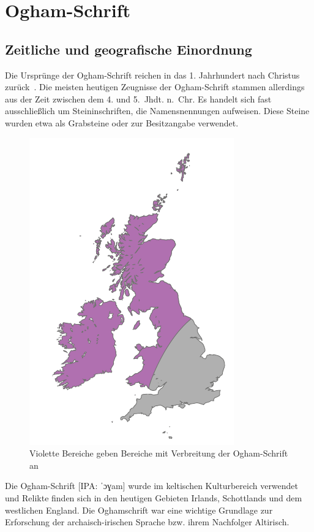 \documentclass[a4paper]{scrartcl}
\begin{document}
\section{Ogham-Schrift}
\subsection{Zeitliche und geografische Einordnung}
%
Die Ursprünge der Ogham-Schrift reichen in das 1. Jahrhundert nach Christus zurück~\cite{ogham-heidnisch1}.
Die meisten heutigen Zeugnisse der Ogham-Schrift stammen allerdings aus der Zeit zwischen dem 4. und 5.~Jhdt. n.~Chr.
Es handelt sich fast ausschließlich um Steininschriften, die Namensnennungen aufweisen. Diese Steine wurden etwa als Grabsteine oder zur Besitzangabe verwendet.
%
\begin{figure}
  \begin{center}
    \includegraphics{images/ogham_areas.pdf}
    \captionsetup{justification=raggedright}
    \caption{Violette Bereiche geben Bereiche mit Verbreitung der Ogham-Schrift an}
  \end{center}
\end{figure}

Die Ogham-Schrift [{\footnotesize IPA:} {\ipafont ˈɔɣam}] wurde im keltischen Kulturbereich verwendet und Relikte finden sich in den heutigen Gebieten Irlands, Schottlands und dem westlichen England. Die Oghamschrift war eine wichtige Grundlage zur Erforschung der archaisch-irischen Sprache bzw. ihrem Nachfolger Altirisch.
\end{document}
